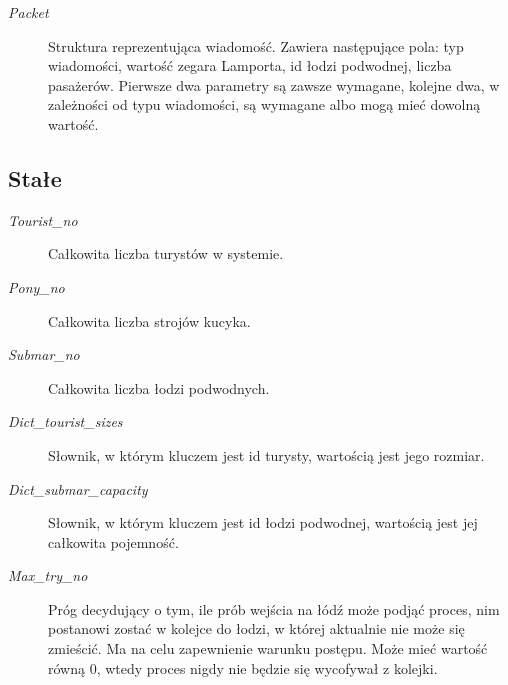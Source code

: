 \documentclass[a4paper]{article}
\begin{document}
\begin{description}
    \item [\textit{Packet}] Struktura reprezentująca wiadomość. Zawiera następujące pola: typ wiadomości, wartość zegara Lamporta, id łodzi podwodnej, liczba pasażerów. Pierwsze dwa parametry są zawsze wymagane, kolejne dwa, w zależności od typu wiadomości, są wymagane albo mogą mieć dowolną wartość.
\end{description}

\resetlinenumber[1]\linenumbers
\subsection{Stałe}
\begin{description}
    \item [\textit{Tourist\_no}] Całkowita liczba turystów w systemie.
    \item [\textit{Pony\_no}] Całkowita liczba strojów kucyka.
    \item [\textit{Submar\_no}] Całkowita liczba łodzi podwodnych.
    \item [\textit{Dict\_tourist\_sizes}] Słownik, w którym kluczem jest id turysty, wartością jest jego rozmiar.
    \item [\textit{Dict\_submar\_capacity}] Słownik, w którym kluczem jest id łodzi podwodnej, wartością jest jej całkowita pojemność.
    \item [\textit{Max\_try\_no}] Próg decydujący o tym, ile prób wejścia na łódź może podjąć proces, nim postanowi zostać w kolejce do łodzi, w której aktualnie nie może się zmieścić. Ma na celu zapewnienie warunku postępu. Może mieć wartość równą 0, wtedy proces nigdy nie będzie się wycofywał z kolejki.
\end{description}


\resetlinenumber[1]\linenumbers
\end{document}
